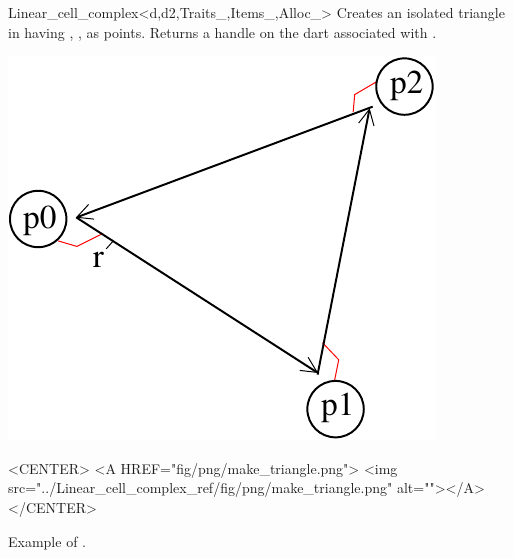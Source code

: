 \begin{ccRefClass}{Linear_cell_complex<d,d2,Traits_,Items_,Alloc_>}
{Creates an isolated triangle in  having , ,  as points.
   Returns a handle on the dart associated with .
}
%
\def\LargFig{.3\textwidth}
  \begin{ccTexOnly}
    \begin{center}
      \includegraphics[width=\LargFig]{Linear_cell_complex_ref/fig/pdf/make_triangle}
    \end{center}
  \end{ccTexOnly}
  \begin{ccHtmlOnly}
    <CENTER>
    <A HREF="fig/png/make_triangle.png">
        <img src="../Linear_cell_complex_ref/fig/png/make_triangle.png" alt=""></A>
    </CENTER>
    \end{ccHtmlOnly}
    \centerline{Example of .}


\end{ccRefClass}
